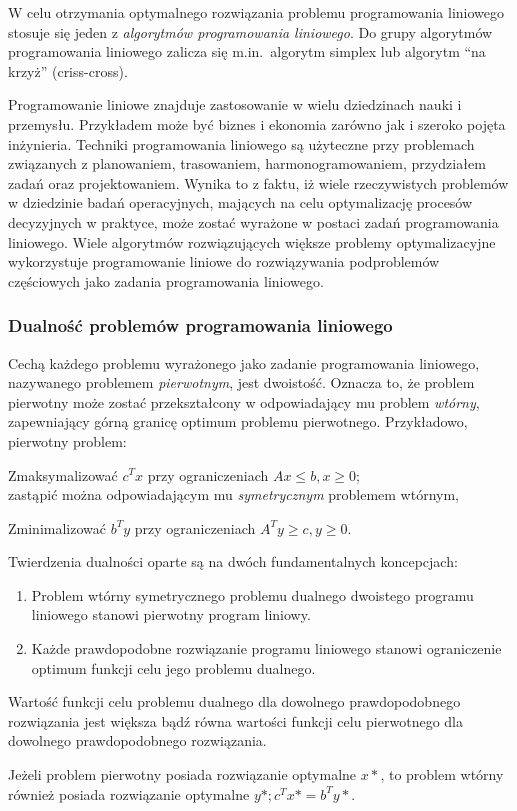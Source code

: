 \par{
  W celu otrzymania optymalnego rozwiązania problemu programowania liniowego
  stosuje się jeden z  \emph{algorytmów programowania liniowego}.
  Do grupy algorytmów programowania liniowego zalicza się m.in.\ algorytm
  simplex lub algorytm ``na krzyż'' (criss-cross).
}
\par{
  Programowanie liniowe znajduje zastosowanie w wielu dziedzinach nauki i przemysłu. 
  Przykładem może być biznes i ekonomia zarówno jak i szeroko pojęta inżynieria.
  Techniki programowania liniowego są użyteczne przy problemach związanych z
  planowaniem, trasowaniem, harmonogramowaniem, przydziałem zadań oraz
  projektowaniem.
  Wynika to z faktu, iż wiele rzeczywistych problemów w dziedzinie badań
  operacyjnych, mających na celu optymalizację procesów decyzyjnych w praktyce,
  może zostać wyrażone w postaci zadań programowania liniowego.
  Wiele algorytmów rozwiązujących większe problemy optymalizacyjne wykorzystuje
  programowanie liniowe do rozwiązywania podproblemów częściowych jako zadania 
  programowania liniowego.
}
\subsubsection{Dualność problemów programowania liniowego}\label{sss_lp_duality}
\par{
  Cechą każdego problemu wyrażonego jako zadanie programowania liniowego,
  nazywanego problemem \emph{pierwotnym}, jest dwoistość.
  Oznacza to, że problem pierwotny może zostać przekształcony w odpowiadający mu
  problem \emph{wtórny}, zapewniający górną granicę optimum problemu
  pierwotnego. 
  Przykładowo, pierwotny problem:\par
  Zmaksymalizować $c^{T}x$ przy ograniczeniach $Ax\leq b, x \geq 0$;\\
  zastąpić można odpowiadającym mu \emph{symetrycznym} problemem wtórnym,\par
  Zminimalizować $b^{T}y$ przy ograniczeniach $A^{T}y \geq c, y \geq 0$.\\
}
\par{
  Twierdzenia dualności oparte są na dwóch fundamentalnych koncepcjach:
  \begin{enumerate}
    \item Problem wtórny symetrycznego problemu dualnego dwoistego programu
      liniowego stanowi pierwotny program liniowy.
    \item Każde prawdopodobne rozwiązanie programu liniowego stanowi
      ograniczenie optimum funkcji celu jego problemu dualnego.
  \end{enumerate}

  \begin{weakduality*}
    Wartość funkcji celu problemu dualnego dla dowolnego prawdopodobnego
    rozwiązania jest większa bądź równa wartości funkcji celu pierwotnego dla
    dowolnego prawdopodobnego rozwiązania.
  \end{weakduality*}
  \begin{strongduality*}
    Jeżeli problem pierwotny posiada rozwiązanie optymalne $x*$, to problem wtórny
    również posiada rozwiązanie optymalne $y*; c^{T}x*=b^{T}y*$.
  \end{strongduality*}
}

